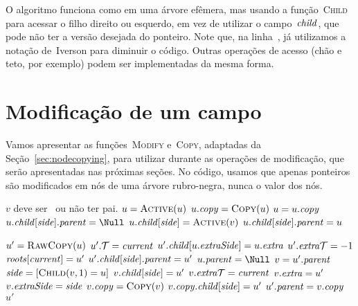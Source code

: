 \documentclass[../../main.tex]{subfiles}
\begin{document}
O algoritmo funciona como em uma árvore efêmera, mas usando a função~\textsc{Child} para acessar o filho direito ou esquerdo, em vez de utilizar o campo~$\mathit{child}$, que pode não ter a versão desejada do ponteiro. Note que, na linha~, já utilizamos a notação de~Iverson para diminuir o código. Outras operações de acesso (chão e teto, por exemplo) podem ser implementadas da mesma forma.

\section{Modificação de um campo}

Vamos apresentar as funções~\textsc{Modify} e~\textsc{Copy}, adaptadas da Seção~\ref{sec:nodecopying}, para utilizar durante as operações de modificação, que serão apresentadas nas próximas seções. No código, usamos que apenas ponteiros são modificados em nós de uma árvore rubro-negra, nunca o valor dos nós.

\begin{algorithm}
\begin{algorithmic}[1]

\Require $v$ deve ser~ ou não ter pai.
	\State $u = \Call{Active}{u}$
		\State $u.\cp = \Call{Copy}{u}$
		\State $u = u.\mathit{copy}$
	\EndIf
		\State $u.\child[\side].\parent = \Null$
	\EndIf
	\State $u.\child[\side] = \Call{Active}{v}$
		\State $u.\mathit{child}[\mathit{side}].\mathit{parent} = u$
	\EndIf
\EndFunction

	\State $u' = \Call{RawCopy}{u}$
	\State $u'.\mathcal{T} = \mathit{current}$
		\State $u'.\mathit{child}[u.\mathit{extraSide}] = u.\mathit{extra}$
		\State $u'.\mathit{extra\mathcal{T}} = -1$ 
	\EndIf
		\State $\mathit{roots}[\mathit{current}] = u'$
	\EndIf
			\State $u'.\mathit{child}[\mathit{side}].\mathit{parent} = u'$
		\EndIf
	\EndFor
	\State $u.\parent = \Null$
		\State $v = u'.\mathit{parent}$
		\State $\side = [\Call{Child}{v, 1} = u]$ \label{line:copyrb:side}
			\State $v.\mathit{child}[\mathit{side}] = u'$
			\State $v.\mathit{extra\mathcal{T}} = \mathit{current}$
			\State $v.\mathit{extra} = u'$
			\State $v.\mathit{extraSide} = \mathit{side}$
		\Else
			\State $v.\cp = \Call{Copy}{v}$
			\State $v.\mathit{copy}.\mathit{child}[\mathit{side}] = u'$
			\State $u'.\mathit{parent} = v.\mathit{copy}$
		\EndIf
	\EndIf
	\State \Return $u'$
\EndFunction

\end{algorithmic}
\end{algorithm}
\end{document}
